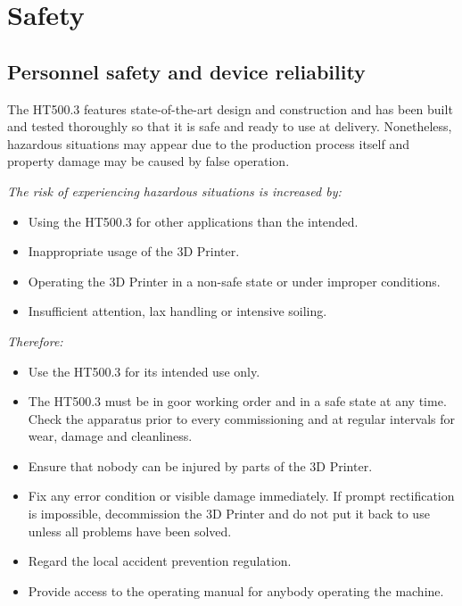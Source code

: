 \section{Safety}



\subsection {Personnel safety and device reliability}

The HT500.3 features state-of-the-art design and construction and has been built and tested thoroughly so that it is safe and ready to use at delivery. Nonetheless, hazardous situations may appear due to the production process itself and property damage may be caused by false operation.

\emph{The risk of experiencing hazardous situations is increased by:}

\begin{itemize}
  \item Using the HT500.3 for other applications than the intended.
  \item Inappropriate usage of the 3D Printer.
  \item Operating the 3D Printer in a non-safe state or under improper conditions.
  \item Insufficient attention, lax handling or intensive soiling.
\end{itemize}

\emph{Therefore:}
\begin{itemize}
  \item Use the HT500.3 for its intended use only.
  \item The HT500.3 must be in goor working order and in a safe state at any time. Check the apparatus prior to every commissioning
        and at regular intervals for wear, damage and cleanliness.
  \item Ensure that nobody can be injured by parts of the 3D Printer.
  \item Fix any error condition or visible damage immediately. If prompt rectification is impossible, 
        decommission the 3D Printer and do not put it back to use unless all problems have been solved.
  \item Regard the local accident prevention regulation.
  \item Provide access to the operating manual for anybody operating the machine.
\end{itemize}

